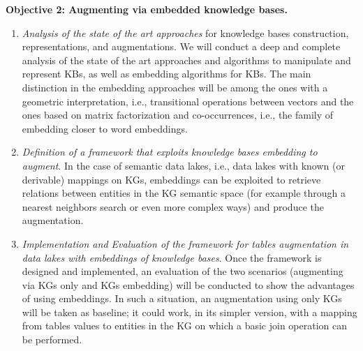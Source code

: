 \noindent\textbf{Objective 2: Augmenting via embedded knowledge bases.}
\begin{enumerate}
    \item \textit{Analysis of the state of the art approaches} for knowledge bases construction, representations, and augmentations. We will conduct a deep and complete analysis of the state of the art approaches and algorithms to manipulate and represent KBs, as well as embedding algorithms for KBs. The main distinction in the embedding approaches will be among the ones with a geometric interpretation, i.e., transitional operations between vectors and the ones based on matrix factorization and co-occurrences, i.e., the family of embedding closer to word embeddings.
    \item \textit{Definition of a framework that exploits knowledge bases embedding to augment}. In the case of semantic data lakes, i.e., data lakes with known (or derivable) mappings on KGs, embeddings can be exploited to retrieve relations between entities in the KG semantic space (for example through a nearest neighbors search or even more complex ways) and produce the augmentation. 
    \item \textit{Implementation and Evaluation of the framework for tables augmentation in data lakes with embeddings of knowledge bases}. Once the framework is designed and implemented, an evaluation of the two scenarios (augmenting via KGs only and KGs embedding) will be conducted to show the advantages of using embeddings. In such a situation, an augmentation using only KGs will be taken as baseline; it could work, in its simpler version, with a mapping from tables values to entities in the KG on which a basic join operation can be performed.
\end{enumerate}



